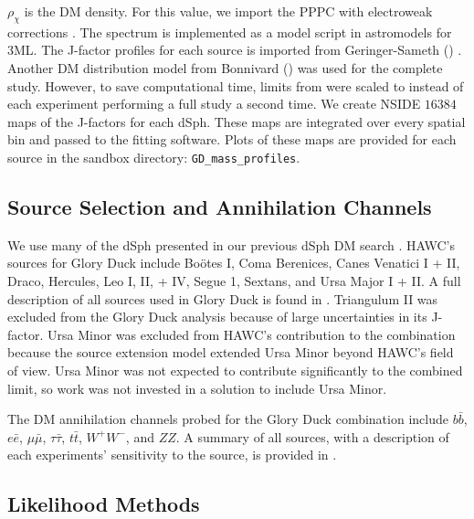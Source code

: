$\rho_{\chi}$ is the DM density.
For this value, we import the PPPC with electroweak corrections \cite{Cirelli_2011}.
The spectrum is implemented as a model script in astromodels for 3ML.
The J-factor profiles for each source is imported from Geringer-Sameth (\GS) \cite{Geringer_Sameth_2015}.
Another DM distribution model from Bonnivard (\B) \cite{Bonnivard:2014kza} was used for the complete study.
However, to save computational time, limits from \GS were scaled to \B instead of each experiment performing a full study a second time.
We create NSIDE $16384$ maps of the J-factors for each dSph.
These maps are integrated over every spatial bin and passed to the fitting software.
Plots of these maps are provided for each source in the sandbox directory: \texttt{GD\_mass\_profiles}.

\subsection{Source Selection and Annihilation Channels}\label{sec:gd_srcs_y_chan}

We use many of the dSph presented in our previous dSph DM search \cite{Albert_2018}.
HAWC's sources for Glory Duck include Boötes I, Coma Berenices, Canes Venatici I + II, Draco, Hercules, Leo I, II, + IV, Segue 1, Sextans, and Ursa Major I + II.
A full description of all sources used in Glory Duck is found in .
Triangulum II was excluded from the Glory Duck analysis because of large uncertainties in its J-factor.
Ursa Minor was excluded from HAWC's contribution to the combination because the source extension model extended Ursa Minor beyond HAWC's field of view.
Ursa Minor was not expected to contribute significantly to the combined limit, so work was not invested in a solution to include Ursa Minor.

The DM annihilation channels probed for the Glory Duck combination include $b\bar{b}$, $e\bar{e}$, $\mu\bar{\mu}$, $\tau\bar{\tau}$, $t\bar{t}$, $W^+W^-$, and $ZZ$.
A summary of all sources, with a description of each experiments' sensitivity to the source, is provided in .




\subsection{Likelihood Methods} \label{sec:gd_ll_methods}

